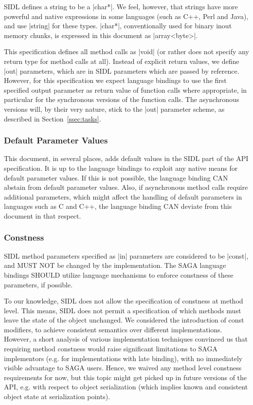    SIDL defines a string to be a |char*|.  We feel, however,
   that strings have more powerful and native expressions in
   some languages (such as C++, Perl and Java), and use |string|
   for these types.  |char*|, conventionally used for binary
   inout memory chunks, is expressed in this document as
   |array<byte>|.

   This specification defines all method calls as |void| (or
   rather does not specify any return type for method calls at
   all).  Instead of explicit return values, we define |out|
   parameters, which are in SIDL parameters which are passed by
   reference.  However, for this specification we expect
   language bindings to use the first specified output parameter
   as return value of function calls where appropriate,
   in particular for the synchronous versions of the function
   calls.  The asynchronous versions will, by their very nature,
   stick to the |out| parameter scheme, as described in
   Section~\ref{ssec:tasks}.

  \subsubsection{Default Parameter Values}

   This document, in several places, adds default values in the
   SIDL part of the API specification.  It is up to the language
   bindings to exploit any native means for default parameter
   values.  If this is not possible, the language binding CAN
   abstain from default parameter values.  Also, if asynchronous
   method calls require additional parameters, which might
   affect the handling of default parameters in languages such
   as C and C++, the language binding CAN deviate from this
   document in that respect.

  \subsubsection{Constness}

   SIDL method parameters specified as |in| parameters are
   considered to be |const|, and MUST NOT be changed by the
   implementation.  The SAGA language bindings SHOULD utilize
   language mechanisms to enforce constness of these parameters,
   if possible.
   
   To our knowledge, SIDL does not allow the specification of
   constness at method level.  This means, SIDL does
   not permit a specification of which methods must leave the
   state of the object unchanged.  We considered the
   introduction of const modifiers, to achieve consistent
   semantics over different implementations.  However, a short
   analysis of various implementation techniques convinced us
   that requiring method constness would raise significant
   limitations to SAGA implementors (e.g. for implementations
   with late binding), with no immediately visible advantage to
   SAGA users.  Hence, we waived any method level constness
   requirements for now, but this topic might get picked up in
   future versions of the API, e.g. with respect to object
   serialization (which implies known and consistent object
   state at serialization points).  

